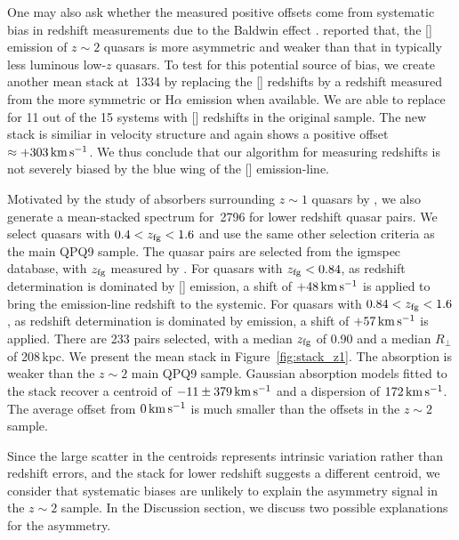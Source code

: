 \documentclass[iop]{emulateapj}
\begin{document}
One may also ask whether the measured positive offsets come from systematic bias in redshift
measurements due to the Baldwin effect \citep{Baldwin77}. \cite{Shen16} reported that, the
[] emission of $z\sim2$ quasars is more asymmetric and weaker than that in typically
less luminous low-$z$ quasars. To test for this potential source of bias, we create another mean
stack at \,1334 by replacing the [] redshifts by a redshift measured from the
more symmetric  or H$\alpha$ emission when available. We are able to replace for 11 out
of the 15 systems with [] redshifts in the original sample. The new stack is similiar in
velocity structure and again shows a positive offset $\approx+303\,{\rm km\,s^{-1}}$. We thus
conclude that our algorithm for measuring redshifts is not severely biased by the blue wing of the
[] emission-line.

Motivated by the study of  absorbers surrounding $z\sim1$ quasars by \cite{Johnson+15},
we also generate a mean-stacked spectrum for \,2796 for lower redshift quasar pairs.
We select quasars with $0.4<z_{\rm fg}<1.6$ and use the same other selection criteria as the main
QPQ9 sample. The quasar pairs are selected from the igmspec database, with $z_{\rm fg}$ measured
by \cite{HewettWild10}. For quasars with $z_{\rm fg}<0.84$, as redshift determination is dominated
by [] emission, a shift of $+48\,{\rm km\,s^{-1}}$ is applied to bring the emission-line
redshift to the systemic. For quasars with $0.84<z_{\rm fg}<1.6$, as redshift determination is
dominated by  emission, a shift of $+57\,{\rm km\,s^{-1}}$ is applied. There are 233
pairs selected, with a median $z_{\rm fg}$ of 0.90 and a median $R_\perp$ of 208\,kpc. We present
the mean stack in Figure~\ref{fig:stack_z1}. The absorption is weaker than the $z\sim2$ main QPQ9
sample. Gaussian absorption models fitted to the stack recover a centroid of
$-11\pm379\,{\rm km\,s^{-1}}$ and a dispersion of $172\,{\rm km\,s^{-1}}$. The average offset
from $0\,{\rm km\,s^{-1}}$ is much smaller than the offsets in the $z\sim2$ sample.

Since the large scatter in the centroids represents intrinsic variation rather than redshift
errors, and the  stack for lower redshift suggests a different centroid, we consider
that
systematic biases are unlikely to explain the asymmetry signal in the $z\sim2$ sample.
In the Discussion section, we discuss two possible explanations for the asymmetry.
\end{document}
